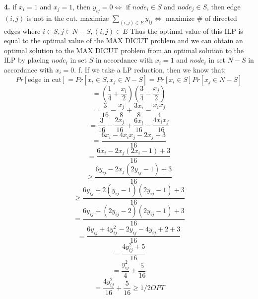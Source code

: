 \documentclass[oneside]{homework} %
\begin{document}
\newline
\textbf{4.} if $x_i = 1$ and $x_j = 1$, then $y_{ij} = 0 \Leftrightarrow$ if $node_i \in S$ and $node_j \in S$, then edge $(i,j)$ is not in the cut.
\newline
\newline
maximize $\sum\limits_{(i,j) \in E}y_{ij} \Leftrightarrow$ maximize \# of directed edges where $i \in S, j \in N-S, (i,j) \in E$
\newline
\newline
Thus the optimal value of this ILP is equal to the optimal value of the MAX DICUT problem and we can obtain an optimal solution to the MAX DICUT problem from an optimal solution to the ILP by placing $node_i$ in set $S$ in accordance with $x_i = 1$ and $node_i$ in set $N-S$ in accordance with $x_i = 0$.
\newline
\newline
{\large f.} If we take a LP reduction, then we know that: $$Pr[\text{edge in cut}] = Pr[x_i \in S, x_j \in N-S] = Pr[x_i \in S]Pr[x_j \in N-S]$$ 
$$=(\frac{1}{4} + \frac{x_i}{2})(\frac{3}{4} - \frac{x_j}{2})$$
$$=\frac{3}{16} - \frac{x_j}{8} + \frac{3x_i}{8} - \frac{x_i x_j}{4}$$
$$= \frac{3}{16} - \frac{2x_j}{16} + \frac{6x_i}{16} - \frac{4x_i x_j}{16}$$
$$= \frac{6x_i - 4x_i x_j - 2x_j + 3}{16}$$
$$= \frac{6x_i - 2x_j(2x_i - 1) + 3}{16}$$
$$\geq \frac{6y_{ij} - 2x_j(2y_{ij} - 1) + 3}{16}$$
$$\geq \frac{6y_{ij} + 2(y_{ij} - 1)(2y_{ij} - 1) + 3}{16}$$
$$= \frac{6y_{ij} + (2y_{ij} - 2)(2y_{ij} - 1) + 3}{16}$$
$$= \frac{6y_{ij} + 4y_{ij}^2 - 2y_{ij} - 4y_{ij} + 2 + 3}{16}$$
$$= \frac{4y_{ij}^2 + 5}{16}$$
$$= \frac{y_{ij}^2}{4} + \frac{5}{16}$$
$$= \frac{4y_{ij}^2}{16} + \frac{5}{16} \geq 1/2OPT$$
\end{document}
